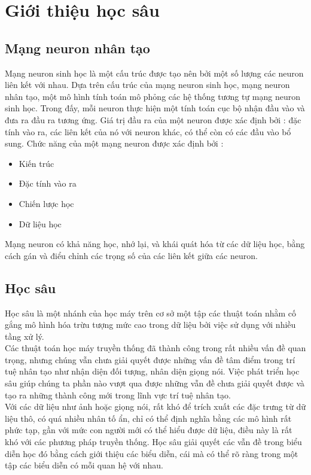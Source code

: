 \documentclass[a4paper,12pt]{report}
\begin{document}
\chapter{Giới thiệu học sâu}
\section{Mạng neuron nhân tạo}
Mạng neuron sinh học là một cấu trúc được tạo nên bởi một số lượng các neuron liên kết với nhau. Dựa trên cấu trúc của mạng neuron sinh học,
mạng neuron nhân tạo, một mô hình tính toán mô phỏng các hệ thống tương tự mạng neuron sinh học. Trong đấy,  mỗi neuron thực hiện một tính toán cục bộ nhận đầu vào và đưa ra đầu ra tương ứng.  Giá trị đầu ra của một neuron được xác định bởi : đặc tính vào ra, các liên kết của nó với neuron khác, có thể còn có các đầu vào bổ sung. Chức năng của một  mạng neuron được xác định bởi :
\begin{itemize}
\item Kiến trúc
\item Đặc tính vào ra
\item Chiến lược học
\item Dữ liệu học 
\end{itemize}
Mạng neuron có khả năng học, nhớ lại, và khái quát hóa từ các dữ liệu học, bằng cách gán và điểu chỉnh các trọng số của các liên kết giữa các neuron.
\section{Học sâu}
Học sâu là một nhánh của học máy trên cơ sở một tập các thuật toán nhằm cố gắng mô hình hóa trừu tượng mức cao trong dữ liệu bởi việc sử dụng với nhiều tầng xử lý. \\

Các thuật toán học máy truyền thống đã thành công trong rất nhiều vấn đề quan trọng, nhưng chúng vẫn chưa giải quyết được những vấn đề tâm điểm trong trí tuệ nhân tạo như nhận diện đối tượng, nhân diện giọng nói. Việc phát triển học sâu giúp chúng ta phần nào vượt qua được những vẫn đề chưa giải quyết được và tạo ra những thành công mới trong lĩnh vực trí tuệ nhân tạo.\\

Với các dữ liệu như ảnh hoặc giọng nói, rất khó để trích xuất các đặc trưng từ dữ liệu thô, có quá nhiều nhân tố ẩn, chỉ có thể định nghĩa bằng các mô hình rất phức tạp, gần với mức con người mới có thể hiểu được dữ liệu, điều này là rất khó với các phương pháp truyền thống. 
Học sâu giải quyết các vẫn đề trong biểu diễn học đó bằng cách giới thiệu các biểu diễn, cái mà có thể rõ ràng trong một tập các biểu diễn có mỗi quan hệ với nhau. \\
\end{document}
